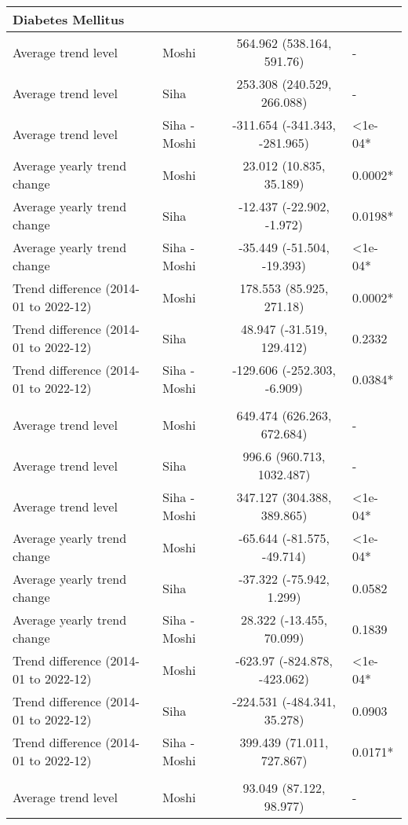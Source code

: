 \begin{longtable}{l|lcl}
\multicolumn{4}{l}{Diabetes Mellitus} \\ 
\midrule\addlinespace[2.5pt]
Average trend level & Moshi & 564.962 (538.164, 591.76) & - \\ 
Average trend level & Siha & 253.308 (240.529, 266.088) & - \\ 
Average trend level & Siha - Moshi & -311.654 (-341.343, -281.965) & <1e-04* \\ 
Average yearly trend change & Moshi & 23.012 (10.835, 35.189) & 0.0002* \\ 
Average yearly trend change & Siha & -12.437 (-22.902, -1.972) & 0.0198* \\ 
Average yearly trend change & Siha - Moshi & -35.449 (-51.504, -19.393) & <1e-04* \\ 
Trend difference (2014-01 to 2022-12) & Moshi & 178.553 (85.925, 271.18) & 0.0002* \\ 
Trend difference (2014-01 to 2022-12) & Siha & 48.947 (-31.519, 129.412) & 0.2332 \\ 
Trend difference (2014-01 to 2022-12) & Siha - Moshi & -129.606 (-252.303, -6.909) & 0.0384* \\ 
\midrule\addlinespace[2.5pt]
\multicolumn{4}{l}{Gastrointestinal Infections} \\ 
\midrule\addlinespace[2.5pt]
Average trend level & Moshi & 649.474 (626.263, 672.684) & - \\ 
Average trend level & Siha & 996.6 (960.713, 1032.487) & - \\ 
Average trend level & Siha - Moshi & 347.127 (304.388, 389.865) & <1e-04* \\ 
Average yearly trend change & Moshi & -65.644 (-81.575, -49.714) & <1e-04* \\ 
Average yearly trend change & Siha & -37.322 (-75.942, 1.299) & 0.0582 \\ 
Average yearly trend change & Siha - Moshi & 28.322 (-13.455, 70.099) & 0.1839 \\ 
Trend difference (2014-01 to 2022-12) & Moshi & -623.97 (-824.878, -423.062) & <1e-04* \\ 
Trend difference (2014-01 to 2022-12) & Siha & -224.531 (-484.341, 35.278) & 0.0903 \\ 
Trend difference (2014-01 to 2022-12) & Siha - Moshi & 399.439 (71.011, 727.867) & 0.0171* \\ 
\midrule\addlinespace[2.5pt]
\multicolumn{4}{l}{Infectious Eye Disease} \\ 
\midrule\addlinespace[2.5pt]
Average trend level & Moshi & 93.049 (87.122, 98.977) & - \\ 

\end{longtable}
